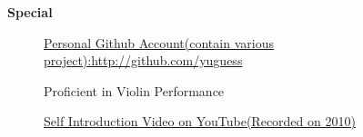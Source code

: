 \documentclass[letterpaper,11pt]{article}
\newcommand{\resheading}[1]{{\large \colorbox{mygrey}{\begin{minipage}{\textwidth}{\textbf{#1 \vphantom{p\^{E}}}}\end{minipage}}}}
\begin{document}
\resheading{{Special}}
	\begin{description}
        \item[] {\href{http://github.com/yuguess}{Personal Github Account(contain various project):http://github.com/yuguess}}
        \item[] {Proficient in Violin Performance}
        \item[] {\href{http://www.youtube.com/watch?v=zGBpT7A_nYM}{Self Introduction Video on YouTube(Recorded on 2010)}}
	
	\end{description}
\end{document}
